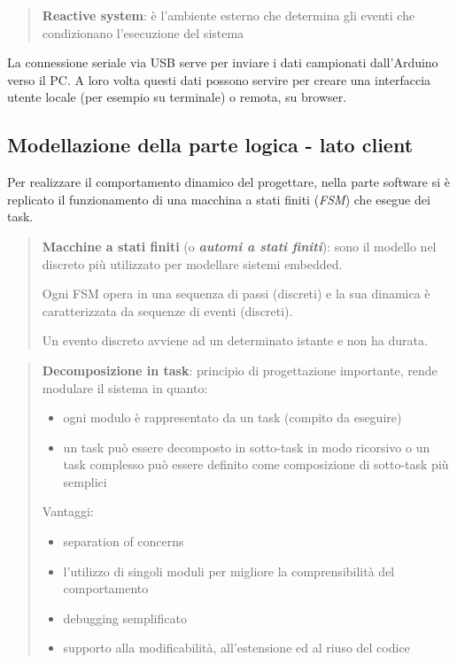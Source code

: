 	\begin{quote}
		\textbf{Reactive system}: è l’ambiente esterno che determina gli eventi che	condizionano l’esecuzione del sistema
	\end{quote}
	
La connessione seriale via USB serve per inviare i dati campionati dall'Arduino verso il PC. A loro volta questi dati possono servire per creare una interfaccia utente locale (per esempio su terminale) o remota, su browser.

\subsection{Modellazione della parte logica - lato client}
Per realizzare il comportamento dinamico del progettare, nella parte software si è replicato il funzionamento di una macchina a stati finiti (\textit{FSM}) che esegue dei task.

	\begin{quote}
		\textbf{Macchine a stati finiti} (o \textbf{\textit{automi a stati finiti}}): sono il modello nel discreto più utilizzato per modellare sistemi embedded.
		
		Ogni FSM opera in una sequenza di passi (discreti) e la sua dinamica è caratterizzata da sequenze di eventi (discreti).
		
		Un evento discreto avviene ad un determinato istante e non ha durata.
	\end{quote}
	
	\begin{quote}
		\textbf{Decomposizione in task}: principio di progettazione importante, rende modulare il sistema in quanto:
		\begin{itemize}
			\item ogni modulo è rappresentato da un task (compito da eseguire)
			\item un task può essere decomposto in sotto-task in modo ricorsivo o un task complesso può essere definito come composizione di sotto-task più semplici
		\end{itemize}
		Vantaggi:
		\begin{itemize}
			\item separation of concerns
			\item l'utilizzo di singoli moduli per migliore la comprensibilità del comportamento
			\item debugging semplificato
			\item supporto alla modificabilità, all'estensione ed al riuso del codice
		\end{itemize}
	\end{quote}
	
